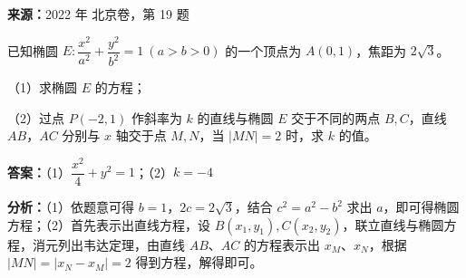 \begin{question}[points=15]
\textbf{来源：}2022 年 北京卷，第 19 题\par
已知椭圆 $E: \dfrac{x^2}{a^2} + \dfrac{y^2}{b^2} = 1\ (a>b>0)$ 的一个顶点为 $A(0,1)$，焦距为 $2\sqrt{3}$。

（1）求椭圆 $E$ 的方程；

（2）过点 $P(-2,1)$ 作斜率为 $k$ 的直线与椭圆 $E$ 交于不同的两点 $B,C$，直线 $AB$，$AC$ 分别与 $x$ 轴交于点 $M,N$，当 $|MN|=2$ 时，求 $k$ 的值。
\begin{solution}
\textbf{答案：}（1）$\dfrac{x^2}{4}+y^2=1$；（2）$k=-4$

\textbf{分析：}（1）依题意可得 $b=1$，$2c=2\sqrt{3}$，结合 $c^2=a^2-b^2$ 求出 $a$，即可得椭圆方程；（2）首先表示出直线方程，设 $B(x_1,y_1),C(x_2,y_2)$，联立直线与椭圆方程，消元列出韦达定理，由直线 $AB$、$AC$ 的方程表示出 $x_M$、$x_N$，根据 $|MN|=|x_N-x_M|=2$ 得到方程，解得即可。


\end{solution}
\end{question}
